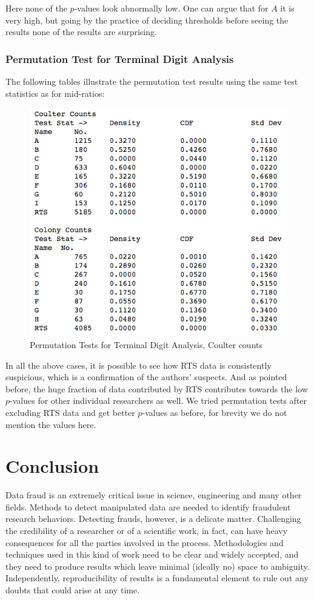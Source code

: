 \documentclass{article}
\begin{document}
Here none of the $p$-values look abnormally low. One can argue that for $A$ it is very high, but going by the practice of deciding thresholds before seeing the results none of the results are surprising.

    \subsubsection{Permutation Test for Terminal Digit
Analysis}\label{permutation-test-for-terminal-digit-analysis}

The following tables illustrate the permutation test results using the
same test statistics as for mid-ratios:

\begin{figure}[H]
\centering
\includegraphics[width=0.7\linewidth]{images/raaz_eq_perm_summary.png}
\caption{Permutation Tests for Terminal Digit Analysis, Coulter counts}
\end{figure}

In all the above cases, it is possible to see how RTS data is
consistently suspicious, which is a confirmation of the authors'
suspects. And as pointed before, the huge fraction of data contributed
by RTS contributes towards the low $p$-values for other individual
researchers as well. We tried permutation tests after excluding RTS data
and get better $p$-values as before, for brevity we do not mention the
values here.

    \section{Conclusion}\label{conclusion}

    Data fraud is an extremely critical issue in science, engineering and
many other fields. Methods to detect manipulated data are needed to
identify fraudulent research behaviors. Detecting frauds, however, is a
delicate matter. Challenging the credibility of a researcher or of a
scientific work, in fact, can have heavy consequences for all the parties
involved in the process. Methodologies and techniques used in this kind
of work need to be clear and widely accepted, and they need to produce
results which leave minimal (ideally no) space to ambiguity. Independently, reproducibility of
results is a fundamental element to rule out any doubts that could arise
at any time.
\end{document}
